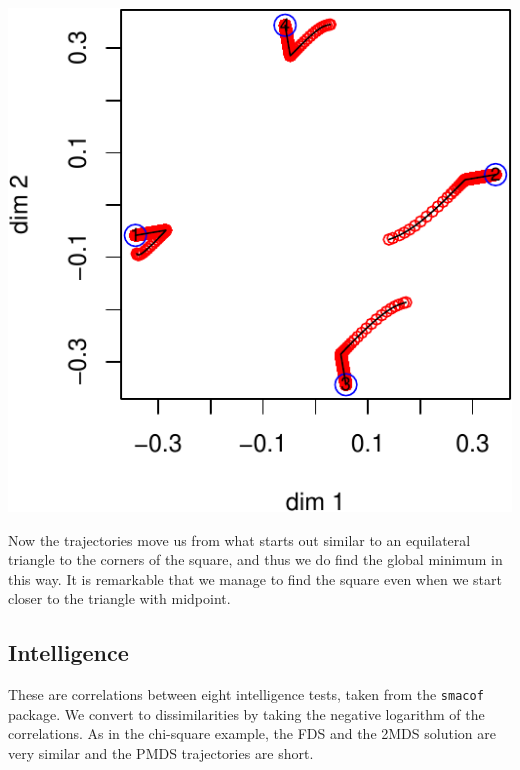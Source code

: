 \documentclass[
  12pt,
]{article}
\begin{document}
\begin{center}\includegraphics{penalty_files/figure-latex/simplex4b-1} \end{center}

Now the trajectories move us from what starts out similar to an
equilateral triangle to the corners of the square, and thus we do find
the global minimum in this way. It is remarkable that we manage to find
the square even when we start closer to the triangle with midpoint.

\subsection{Intelligence}\label{intelligence}

These are correlations between eight intelligence tests, taken from the
\texttt{smacof} package. We convert to dissimilarities by taking the
negative logarithm of the correlations. As in the chi-square example,
the FDS and the 2MDS solution are very similar and the PMDS trajectories
are short.
\end{document}
